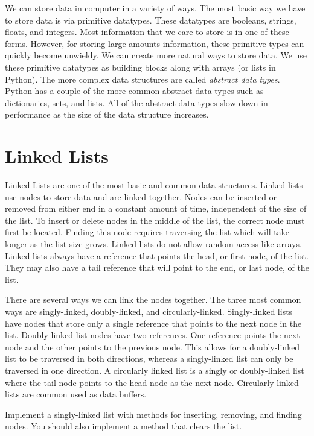 \label{lab:Python_DataStructures}

We can store data in computer in a variety of ways.
The most basic way we have to store data is via primitive datatypes.
These datatypes are booleans, strings, floats, and integers.
Most information that we care to store is in one of these forms.
However, for storing large amounts information, these primitive types can quickly become unwieldy.
We can create more natural ways to store data.  We use these primitive datatypes as building blocks along with arrays (or lists in Python).  The more complex data structures are called \emph{abstract data types}.
Python has a couple of the more common abstract data types such as dictionaries, sets, and lists.
All of the abstract data types slow down in performance as the size of the data structure increases.  

\section*{Linked Lists}
Linked Lists are one of the most basic and common data structures.
Linked lists use nodes to store data and are linked together.
Nodes can be inserted or removed from either end in a constant amount of time, independent of the size of the list.
To insert or delete nodes in the middle of the list, the correct node must first be located.  
Finding this node requires traversing the list which will take longer as the list size grows.  Linked lists do not allow random access like arrays.  Linked lists always have a reference that points the head, or first node, of the list.  They may also have a tail reference that will point to the end, or last node, of the list.

There are several ways we can link the nodes together.  The three most common ways are singly-linked, doubly-linked, and circularly-linked.  Singly-linked lists have nodes that store only a single reference that points to the next node in the list.  Doubly-linked list nodes have two references.  One reference points the next node and the other points to the previous node.  This allows for a doubly-linked list to be traversed in both directions, whereas a singly-linked list can only be traversed in one direction.  A circularly linked list is a singly or doubly-linked list where the tail node points to the head node as the next node.  Circularly-linked lists are common used as data buffers.

\begin{problem}
Implement a singly-linked list with methods for inserting, removing, and finding nodes.  You should also implement a method that clears the list.
\end{problem}

